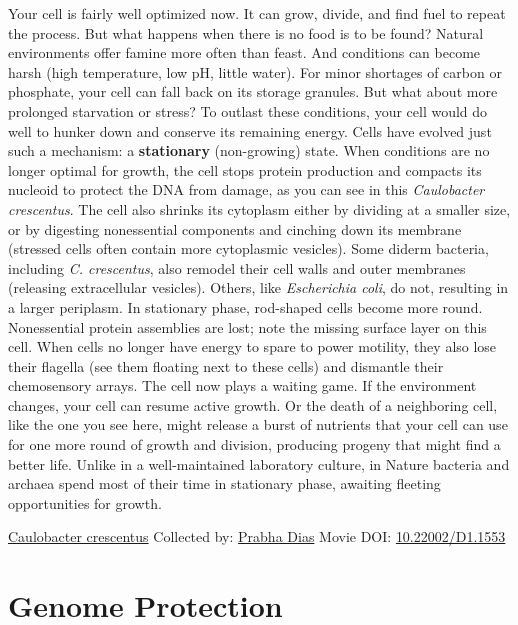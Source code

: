\documentclass[]{tufte-book}
\begin{document}
Your cell is fairly well optimized now. It can grow, divide, and find fuel to repeat the process. But what happens when there is no food is to be found? Natural environments offer famine more often than feast. And conditions can become harsh (high temperature, low pH, little water). For minor shortages of carbon or phosphate, your cell can fall back on its storage granules. But what about more prolonged starvation or stress? To outlast these conditions, your cell would do well to hunker down and conserve its remaining energy. Cells have evolved just such a mechanism: a \textbf{stationary} (non-growing) state. When conditions are no longer optimal for growth, the cell stops protein production and compacts its nucleoid to protect the DNA from damage, as you can see in this \emph{Caulobacter crescentus}. The cell also shrinks its cytoplasm either by dividing at a smaller size, or by digesting nonessential components and cinching down its membrane (stressed cells often contain more cytoplasmic vesicles). Some diderm bacteria, including \emph{C. crescentus}, also remodel their cell walls and outer membranes (releasing extracellular vesicles). Others, like \emph{Escherichia coli}, do not, resulting in a larger periplasm. In stationary phase, rod-shaped cells become more round. Nonessential protein assemblies are lost; note the missing surface layer on this cell. When cells no longer have energy to spare to power motility, they also lose their flagella (see them floating next to these cells) and dismantle their chemosensory arrays. The cell now plays a waiting game. If the environment changes, your cell can resume active growth. Or the death of a neighboring cell, like the one you see here, might release a burst of nutrients that your cell can use for one more round of growth and division, producing progeny that might find a better life. Unlike in a well-maintained laboratory culture, in Nature bacteria and archaea spend most of their time in stationary phase, awaiting fleeting opportunities for growth.



\hypertarget{htmlwidget-7009e1ac9ba2f6397022}{}

\label{fig:8-1}\protect\hyperlink{tree}{Caulobacter crescentus} Collected by: \protect\hyperlink{prabha_dias}{Prabha Dias} Movie DOI: \href{https://doi.org/10.22002/D1.1553}{10.22002/D1.1553}

\hypertarget{genome-protection}{%
\section{Genome Protection}\label{genome-protection}}
\end{document}
